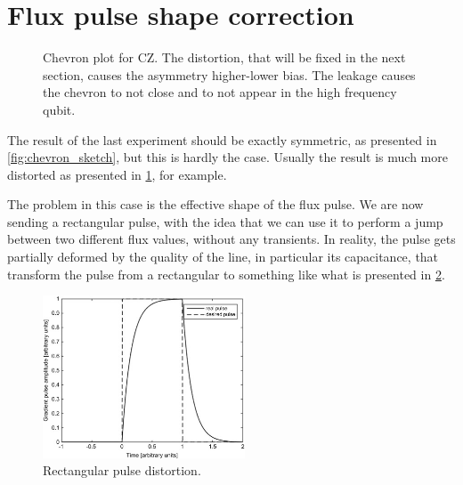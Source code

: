 \section{Flux pulse shape correction}

\begin{figure}[htbp]
    \centering
    \caption{Chevron plot for CZ. The distortion, that will be fixed in the next section, causes the asymmetry higher-lower bias. The leakage causes the chevron to not close and to not appear in the high frequency qubit.}
    \label{fig:chevron_distorted}
\end{figure}

The result of the last experiment should be exactly symmetric, as presented in \cref{fig:chevron_sketch}, but this is hardly the case.
Usually the result is much more distorted as presented in \cref{fig:chevron_distorted}, for example.

The problem in this case is the effective shape of the flux pulse.
We are now sending a rectangular pulse, with the idea that we can use it to perform a jump between two different flux values, without any transients.
In reality, the pulse gets partially deformed by the quality of the line, in particular its capacitance, that transform the pulse from a rectangular to something like what is presented in \cref{fig:rectangular_distortion}.

\begin{figure}[ht]
    \centering
    \includegraphics[width=6cm]{Two-qubits calibration/Figures/rectangular_distortion.jpg}
    \caption{Rectangular pulse distortion.}
    \label{fig:rectangular_distortion}
\end{figure}

